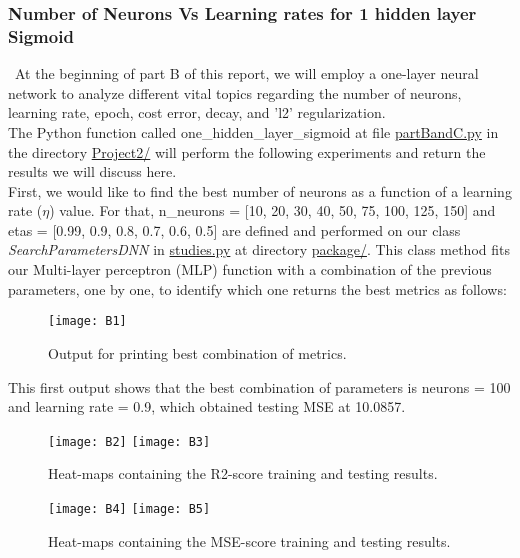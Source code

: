 \subsubsection{Number of Neurons Vs Learning rates for 1 hidden layer Sigmoid}
\label{chap:Number of Neurons Vs Learning rates for 1 hidden layer Sigmoid}

\quad \, At the beginning of part B of this report, we will employ a one-layer neural network to analyze different vital topics regarding the number of neurons, learning rate, epoch, cost error, decay, and 'l2' regularization.\\

The Python function called one\_hidden\_layer\_sigmoid at file \href{https://github.com/fabiorodp/UiO-FYS-STK4155/blob/master/Project2/partBandC.py}{partBandC.py} in the directory \href{https://github.com/fabiorodp/UiO-FYS-STK4155/blob/master/Project2/}{Project2/} will perform the following experiments and return the results we will discuss here.\\

First, we would like to find the best number of neurons as a function of a learning rate ($\eta$) value. For that, n\_neurons = [10, 20, 30, 40, 50, 75, 100, 125, 150] and etas = [0.99, 0.9, 0.8, 0.7, 0.6, 0.5] are defined and performed on our class \textit{SearchParametersDNN} in \href{https://github.com/fabiorodp/UiO-FYS-STK4155/blob/master/Project2/package/studies.py}{studies.py} at directory \href{https://github.com/fabiorodp/UiO-FYS-STK4155/blob/master/Project2/package/}{package/}. This class method fits our Multi-layer perceptron (MLP) function with a combination of the previous parameters, one by one, to identify which one returns the best metrics as follows:

\begin{figure}[H]
\label{fig:B1}
\centering
\texttt{[image: B1]}
\caption{Output for printing best combination of metrics.}
\end{figure}

This first output shows that the best combination of parameters is neurons = 100 and learning rate = 0.9, which obtained testing MSE at 10.0857.

\begin{figure}[H]
\label{fig:B2}
\centering
\texttt{[image: B2]}
\texttt{[image: B3]}
\caption{Heat-maps containing the R2-score training and testing results.}
\end{figure}

\begin{figure}[H]
\label{fig:B3}
\centering
\texttt{[image: B4]}
\texttt{[image: B5]}
\caption{Heat-maps containing the MSE-score training and testing results.}
\end{figure}

